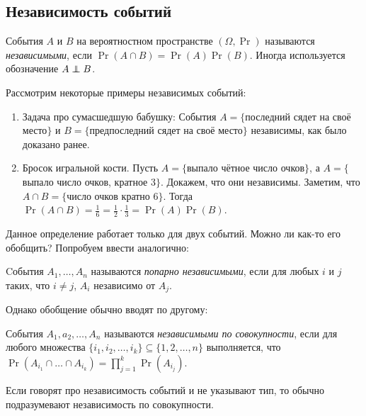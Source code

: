 \subsection{Независимость событий}
\begin{definition}
    События \(A\) и \(B\) на вероятностном пространстве \((\Omega, \Pr)\) называются \emph{независимыми}, если \(\Pr(A \cap B) = \Pr(A)\Pr(B)\). Иногда используется обозначение \(A \independent B\).
\end{definition}
Рассмотрим некоторые примеры независимых событий:
\begin{enumerate}
    \item Задача про сумасшедшую бабушку: События \(A = \{\)последний сядет на своё место\(\}\) и \(B = \{\)предпоследний сядет на своё место\(\}\) независимы, как было доказано ранее.
    
    \item Бросок игральной кости. Пусть \(A = \{\)выпало чётное число очков\(\}\), а \(A = \{\)выпало число очков, кратное 3\(\}\). Докажем, что они независимы. Заметим, что \(A \cap B = \{\)число очков кратно 6\(\}\). Тогда \(\Pr(A \cap B) = \frac{1}{6} = \frac{1}{2} \cdot \frac{1}{3} = \Pr(A)\Pr(B)\).
\end{enumerate}
Данное определение работает только для двух событий. Можно ли как-то его обобщить? Попробуем ввести аналогично:
\begin{definition}
    Cобытия \(A_1, \ldots, A_n\) называются \emph{попарно независимыми}, если для любых \(i\) и \(j\) таких, что \(i \neq j\), \(A_i\) независимо от \(A_j\).
\end{definition}
Однако обобщение обычно вводят по другому:
\begin{definition}
    События \(A_1, a_2, \ldots, A_n\) называются \emph{независимыми по совокупности}, если для любого множества \(\{i_1, i_2, \ldots, i_k\} \subseteq \{1, 2, \ldots, n\}\) выполняется, что \(\Pr(A_{i_1}\cap\ldots\cap A_{i_k}) = \prod\limits_{j = 1}^{k} \Pr(A_{i_j})\).
\end{definition}
\begin{remark}
    Если говорят про независимость событий и не указывают тип, то обычно подразумевают независимость по совокупности.
\end{remark}

